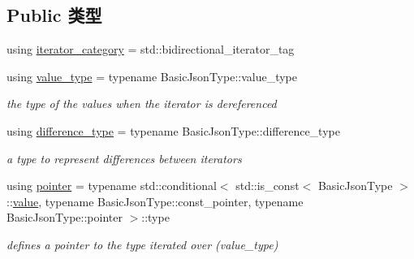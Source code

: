\subsection*{Public 类型}
\begin{DoxyCompactItemize}
\item 
using \mbox{\hyperlink{classnlohmann_1_1detail_1_1iter__impl_ad9e091f5c70b34b5b1abc1ab15fd9106}{iterator\+\_\+category}} = std\+::bidirectional\+\_\+iterator\+\_\+tag
\item 
\mbox{\label{classnlohmann_1_1detail_1_1iter__impl_ab35586a44f2222272c5346baa3013f67}} 
using \mbox{\hyperlink{classnlohmann_1_1detail_1_1iter__impl_ab35586a44f2222272c5346baa3013f67}{value\+\_\+type}} = typename Basic\+Json\+Type\+::value\+\_\+type
\begin{DoxyCompactList}\small\item\em the type of the values when the iterator is dereferenced \end{DoxyCompactList}\item 
\mbox{\label{classnlohmann_1_1detail_1_1iter__impl_a2f7ea9f7022850809c60fc3263775840}} 
using \mbox{\hyperlink{classnlohmann_1_1detail_1_1iter__impl_a2f7ea9f7022850809c60fc3263775840}{difference\+\_\+type}} = typename Basic\+Json\+Type\+::difference\+\_\+type
\begin{DoxyCompactList}\small\item\em a type to represent differences between iterators \end{DoxyCompactList}\item 
\mbox{\label{classnlohmann_1_1detail_1_1iter__impl_a69e52f890ce8c556fd68ce109e24b360}} 
using \mbox{\hyperlink{classnlohmann_1_1detail_1_1iter__impl_a69e52f890ce8c556fd68ce109e24b360}{pointer}} = typename std\+::conditional$<$ std\+::is\+\_\+const$<$ Basic\+Json\+Type $>$\+::\mbox{\hyperlink{classnlohmann_1_1detail_1_1iter__impl_ab447c50354c6611fa2ae0100ac17845c}{value}}, typename Basic\+Json\+Type\+::const\+\_\+pointer, typename Basic\+Json\+Type\+::pointer $>$\+::type
\begin{DoxyCompactList}\small\item\em defines a pointer to the type iterated over (value\+\_\+type) \end{DoxyCompactList}\item 

\end{DoxyCompactItemize}
